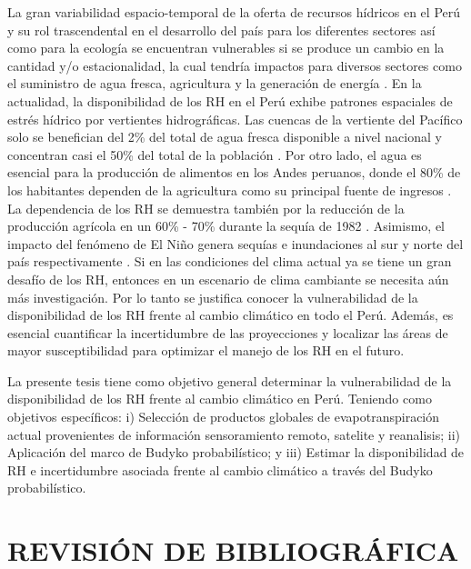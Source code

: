 \documentclass[12pt]{article}
\begin{document}
La gran variabilidad espacio-temporal de la oferta de recursos hídricos en el Perú y su rol trascendental en el desarrollo del país para los diferentes sectores así como para la ecología se encuentran vulnerables si se produce un cambio en la cantidad y/o estacionalidad, la cual tendría impactos para diversos sectores como el suministro de agua fresca, agricultura y la generación de energía \citep{barnett2005potential,vergara2007economic,salzmann2009integrated}. En la actualidad, la disponibilidad de los RH en el Perú exhibe patrones espaciales de estrés hídrico por vertientes hidrográficas. Las cuencas de la vertiente del Pacífico solo se benefician del 2\% del total de agua fresca disponible a nivel nacional y concentran casi el 50\% del total de la población \citep{rau2018hydroclimatic}. Por otro lado, el agua es esencial para la producción de alimentos en los Andes peruanos, donde el 80\% de los habitantes dependen de la agricultura como su principal fuente de ingresos \citep{lasage2015stepwise}. La dependencia de los RH se demuestra también por la reducción de la producción agrícola en un 60\% - 70\% durante la sequía de 1982 \citep{zimmerer1999overlapping}. Asimismo, el impacto del fenómeno de El Niño genera sequías e inundaciones al sur y norte del país respectivamente \citep{lavado2014impactos,Huerta2019a}. Si en las condiciones del clima actual ya se tiene un gran desafío de los RH, entonces en un escenario de clima cambiante se necesita aún más investigación. Por lo tanto se justifica conocer la vulnerabilidad de la disponibilidad de los RH frente al cambio climático en todo el Perú. Además, es esencial cuantificar la incertidumbre de las proyecciones y localizar las áreas de mayor susceptibilidad para optimizar el manejo de los RH en el futuro.

La presente tesis tiene como objetivo general determinar la vulnerabilidad de la disponibilidad de los RH frente al cambio climático en Perú. Teniendo como objetivos específicos: i) Selección de productos globales de evapotranspiración actual provenientes de información sensoramiento remoto, satelite y reanalisis; ii) Aplicación del marco de Budyko probabilístico; y iii) Estimar la disponibilidad de RH e incertidumbre asociada frente al cambio climático a través del Budyko probabilístico.

\clearpage
\vspace*{0.5mm}
\section{REVISIÓN DE BIBLIOGRÁFICA}
\end{document}
